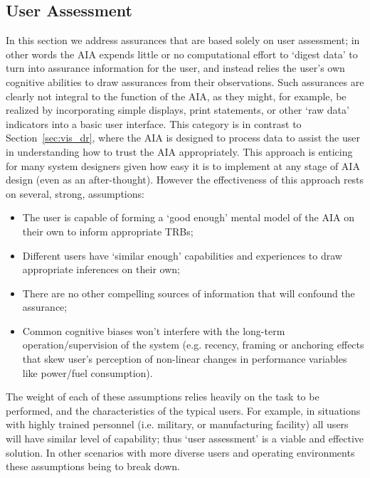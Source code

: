
\subsection{User Assessment} \label{sec:user_assessment}
In this section we address assurances that are based solely on user assessment; in other words the AIA expends little or no computational effort to `digest data' to turn into assurance information for the user, and instead relies the user's own cognitive abilities to draw assurances from their observations. Such assurances are clearly not integral to the function of the AIA, as they might, for example, be realized by incorporating simple displays, print statements, or other `raw data' indicators into a basic user interface. 
This category is in contrast to Section~\ref{sec:vis_dr}, where the AIA is designed to process data to assist the user in understanding how to trust the AIA appropriately. This approach is enticing for many system designers given how easy it is to implement at any stage of AIA design (even as an after-thought). However the effectiveness of this approach rests on several, strong, assumptions:

\begin{itemize}
    \item The user is capable of forming a `good enough' mental model of the AIA on their own to inform appropriate TRBs;
    \item Different users have `similar enough' capabilities and experiences to draw appropriate inferences on their own;
    \item There are no other compelling sources of information that will confound the assurance;
    \item Common cognitive biases won't interfere with the long-term operation/supervision of the system (e.g. recency, framing or anchoring effects that skew user's perception of non-linear changes in performance variables like power/fuel consumption). 
\end{itemize}

The weight of each of these assumptions relies heavily on the task to be performed, and the characteristics of the typical users. For example, in situations with highly trained personnel (i.e. military, or manufacturing facility) all users will have similar level of capability; thus `user assessment' is a viable and effective solution. 
In other scenarios with more diverse users and operating environments these assumptions being to break down. 

